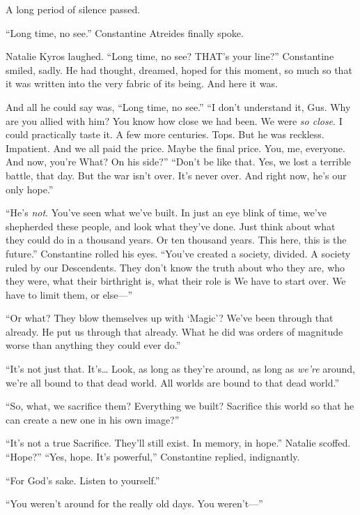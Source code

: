 
A long period of silence passed.

“Long time, no see.” Constantine Atreides finally spoke.

Natalie Kyros laughed. “Long time, no see? THAT’s your line?”
\SmallVSpace
Constantine smiled, sadly. He had thought, dreamed, hoped for this moment, so much so that it was written into the very fabric of its being. And here it was.

And all he could say was, “Long time, no see.”
\SomeVSpace
“I don’t understand it, Gus. Why are you allied with him? You know how close we had been. We were \emph{so close}. I could practically taste it. A few more centuries. Tops. But he was reckless. Impatient. And we all paid the price. Maybe the final price. You, me, everyone. And now, you’re{\el} What? On his side?”
\SmallVSpace
“Don’t be like that. Yes, we lost a terrible battle, that day. But the war isn’t over. It’s never over. And right now, he’s our only hope.”

“He’s \emph{not}. You’ve seen what we’ve built. In just an eye blink of time, we’ve shepherded these people, and look what they’ve done. Just think about what they could do in a thousand years. Or ten thousand years. This here, this is the future.”
\SmallVSpace
Constantine rolled his eyes. “You’ve created a society, divided. A society ruled by our Descendents. They don’t know the truth about who they are, who they were, what their birthright is, what their role is{\el} We have to start over. We have to limit them, or else\mbox{---}”

“Or what? They blow themselves up with ‘Magic’? We’ve been through that already. He put us through that already. What he did was orders of magnitude worse than anything they could ever do.”

“It’s not just that. It’s… Look, as long as they’re around, as long as \emph{we’re} around, we’re all bound to that dead world. All worlds are bound to that dead world.”

“So, what, we sacrifice them? Everything we built? Sacrifice this world so that he can create a new one in his own image?”

“It’s not a true Sacrifice. They’ll still exist. In memory, in hope.”
\SmallVSpace
Natalie scoffed. “Hope?”
\SmallVSpace
“Yes, hope. It’s powerful,” Constantine replied, indignantly.

“For God’s sake. Listen to yourself.”

“You weren’t around for the really old days. You weren’t\mbox{---}”


